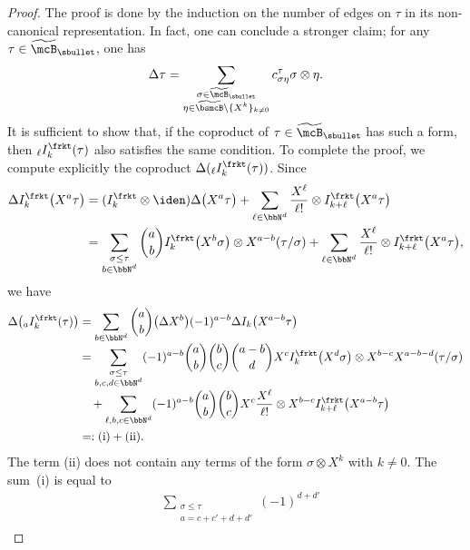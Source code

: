 \begin{proof}
The proof is done by the induction on the number of edges on $\tau$ in its non-canonical representation. In fact, one can conclude a stronger claim; for any $\tau\in\widetilde{\mcB}_\sbullet$, one has\vspace*{-3pt}
\begin{align}\label{eq:stronger than D}
\Delta\tau=\sum_{\substack{\sigma\in\widetilde{\mcB}_\sbullet\\ \eta\in \widetilde{\bsmcB}\setminus\{X^k\}_{k\neq0}}} c_{\sigma\eta}^\tau\sigma\otimes\eta.
\end{align}
It is sufficient to show that, if the coproduct of $\tau\in\widetilde{\mcB}_\sbullet$ has such a form, then ${}_{\ell}I_k^\frkt(\tau)$ also satisfies the same condition. To complete the proof, we compute explicitly the coproduct $\Delta( {}_{\ell}I_k^\frkt(\tau))$.
Since\vspace*{-3pt}
\begin{align*}
\Delta I_k^\frkt\bigl(X^a\tau\bigr)
&=(I_k^\frkt\otimes\iden)\Delta\bigl(X^a\tau\bigr)
+\sum_{\ell\in\bbN^d}\frac{X^{\ell}}{\ell!}\otimes I_{k+\ell}^\frkt\bigl(X^a\tau\bigr)\\
&=\sum_{\substack{\sigma\le\tau\\ b\in\bbN^d}}\binom{a}{b}
I_k^\frkt \bigl(X^b\sigma\bigr)\otimes X^{a-b}(\tau/\sigma)
+\sum_{\ell\in\bbN^d}\frac{X^{\ell}}{\ell!}\otimes I_{k+\ell}^\frkt\bigl(X^a\tau\bigr),
\end{align*}
we have\vspace*{-3pt}
\begin{align*}
\Delta\bigl({}_{a} I_k^\frkt(\tau)\bigr)
&=\sum_{b\in\bbN^d}\binom{a}{b}
\bigl(\Delta X^b\bigr)(-1)^{a-b}\Delta I_k\bigl(X^{a-b}\tau\bigr)\\[-3pt]
&=\sum_{\substack{\sigma\le\tau\\ b,c,d\in\bbN^d}}(-1)^{a-b}
\binom{a}{b}\binom{b}{c}\binom{a-b}{d}
X^c I_k^\frkt\bigl(X^d\sigma\bigr)
\otimes
X^{b-c} X^{a-b-d}(\tau/\sigma)\\[-3pt]
&\quad+\sum_{\ell,b,c\in\bbN^d}(-1)^{a-b}\binom{a}{b}\binom{b}{c}
X^c\frac{X^\ell}{\ell!}
\otimes
X^{b-c}I_{k+\ell}^\frkt\bigl(X^{a-b}\tau\bigr)\\
&=:(\textup{i})+(\textup{ii}).
\end{align*}
The term (ii) does not contain any terms of the form $\sigma\otimes X^k$ with $k\neq0$. The sum~(i) is equal to\vspace*{-3pt}
\begin{align*}
&\sum_{\substack{\sigma\le\tau \\ a=c+c'+d+d'}}(-1)^{d+d'}

\end{align*}
\end{proof}
